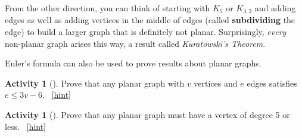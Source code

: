 \documentclass[10pt,]{book}
\newcommand{\terminology}[1]{\textbf{#1}}
\theoremstyle{plain}
\theoremstyle{definition}
\theoremstyle{definition}
\theoremstyle{definition}
\newtheorem{activity}[project]{Activity}
\numberwithin{equation}{chapter}
\begin{document}
\hypertarget{p-1542}{}%
From the other direction, you can think of starting with \(K_5\) or \(K_{3,3}\) and adding edges as well as adding vertices in the middle of edges (called \terminology{subdividing} the edge) to build a larger graph that is definitely not planar.  Surprisingly, \emph{every} non-planar graph arises this way, a result called \emph{Kuratowski's Theorem}.%
\par
\hypertarget{p-1543}{}%
Euler's formula can also be used to prove results about planar graphs.%
\begin{activity}[]\label{activity-290}
\hypertarget{p-1544}{}%
Prove that any planar graph with \(v\) vertices and \(e\) edges satisfies \(e \le 3v - 6\).%
~\hfill{\tiny\hyperlink{a-295}{[hint]}\hypertarget{q-295}{}}\end{activity}
\begin{activity}[]\label{act-planardeg5}
\hypertarget{p-1547}{}%
Prove that any planar graph must have a vertex of degree 5 or less.%
~\hfill{\tiny\hyperlink{a-296}{[hint]}\hypertarget{q-296}{}}\end{activity}
\typeout{************************************************}
\typeout{************************************************}
\end{document}
